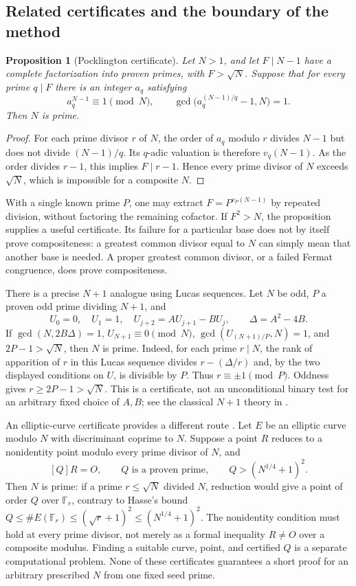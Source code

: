 \documentclass[11pt,a4paper]{article}
\newtheorem{proposition}[theorem]{Proposition}
\theoremstyle{definition}
\theoremstyle{remark}
\numberwithin{equation}{section}
\begin{document}
\subsection{Related certificates and the boundary of the method}

\begin{proposition}[Pocklington certificate]
\label{C:prop:seed-pocklington}
Let $N>1$, and let $F\mid N-1$ have a complete factorization into
proven primes, with $F>\sqrt N$. Suppose that for every prime $q\mid F$
there is an integer $a_q$ satisfying
\[
 a_q^{N-1}\equiv1\pmod N,\qquad
 \gcd\bigl(a_q^{(N-1)/q}-1,N\bigr)=1.
\]
Then $N$ is prime.
\end{proposition}

\begin{proof}
For each prime divisor $r$ of $N$, the order of $a_q$ modulo $r$
divides $N-1$ but does not divide $(N-1)/q$. Its $q$-adic valuation
is therefore $v_q(N-1)$. As the order divides $r-1$, this implies
$F\mid r-1$. Hence every prime divisor of $N$ exceeds $\sqrt N$,
which is impossible for a composite $N$.
\end{proof}

With a single known prime $P$, one may extract
$F=P^{v_P(N-1)}$ by repeated division, without factoring the
remaining cofactor. If $F^2>N$, the proposition supplies a useful
certificate. Its failure for a particular base does not by itself
prove compositeness: a greatest common divisor equal to $N$ can simply
mean that another base is needed. A proper greatest common divisor,
or a failed Fermat congruence, does prove compositeness.

There is a precise $N+1$ analogue using Lucas sequences. Let $N$ be
odd, $P$ a proven odd prime dividing $N+1$, and
\[
 U_0=0,\quad U_1=1,\quad U_{j+2}=A U_{j+1}-B U_j,
 \qquad \Delta=A^2-4B.
\]
If $\gcd(N,2B\Delta)=1$,
$U_{N+1}\equiv0\pmod N$,
$\gcd(U_{(N+1)/P},N)=1$, and $2P-1>\sqrt N$, then $N$ is prime.
Indeed, for each prime $r\mid N$, the rank of apparition of $r$ in
this Lucas sequence divides $r-(\Delta/r)$ and, by the two displayed
conditions on $U$, is divisible by $P$. Thus $r\equiv\pm1\pmod P$.
Oddness gives $r\ge2P-1>\sqrt N$. This is a certificate, not an
unconditional binary test for an arbitrary fixed choice of $A,B$;
see the classical $N+1$ theory in \cite{R077}.

An elliptic-curve certificate provides a different route
\cite{R080}. Let $E$ be an elliptic curve modulo $N$ with
discriminant coprime to $N$. Suppose a point $R$ reduces to a
nonidentity point modulo every prime divisor of $N$, and
\[
 [Q]R=O,\qquad Q\text{ is a proven prime},\qquad
 Q>(N^{1/4}+1)^2.
\]
Then $N$ is prime: if a prime $r\le\sqrt N$ divided $N$, reduction
would give a point of order $Q$ over $\mathbb F_r$, contrary to
Hasse's bound
$Q\le\#E(\mathbb F_r)\le(\sqrt r+1)^2\le(N^{1/4}+1)^2$.
The nonidentity condition must hold at every prime divisor, not merely
as a formal inequality $R\ne O$ over a composite modulus. Finding a
suitable curve, point, and certified $Q$ is a separate computational
problem. None of these certificates guarantees a short proof for an
arbitrary prescribed $N$ from one fixed seed prime.
\end{document}
